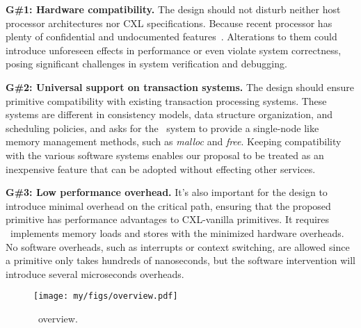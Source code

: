 \ifx\undefined\stale
\noindent \textbf{G\#1: Hardware compatibility.} 
The design should not disturb neither host processor architectures nor CXL specifications.
Because recent processor has plenty of confidential and undocumented features~\cite{tsx, directory_sp19}. Alterations to them could introduce unforeseen effects in performance or even violate system correctness, posing significant challenges in system verification and debugging.

\noindent \textbf{G\#2: Universal support on transaction systems. } 
The design should ensure primitive compatibility with existing transaction processing systems. These systems are different in consistency models, data structure organization, and scheduling policies, and asks for the \name~system to provide a single-node like memory management methods, such as \textit{malloc} and \textit{free}. 
Keeping compatibility with the various software systems enables our proposal to be treated as an inexpensive feature that can be adopted without effecting other services. 

\noindent \textbf{G\#3: Low performance overhead. } 
It's also important for the design to introduce minimal overhead on the critical path, ensuring that the proposed primitive has performance advantages to CXL-vanilla primitives. It requires \name~implements memory loads and stores with the minimized hardware overheads. No software overheads, such as interrupts or context switching, are allowed since a primitive only takes hundreds of nanoseconds, but the software intervention will introduce several microseconds overheads. 
\fi


\begin{figure}[t]
  \centering
   \texttt{[image: my/figs/overview.pdf]}
  \caption{
    \name~overview.
  }
  \label{fig:overview}
\end{figure}

